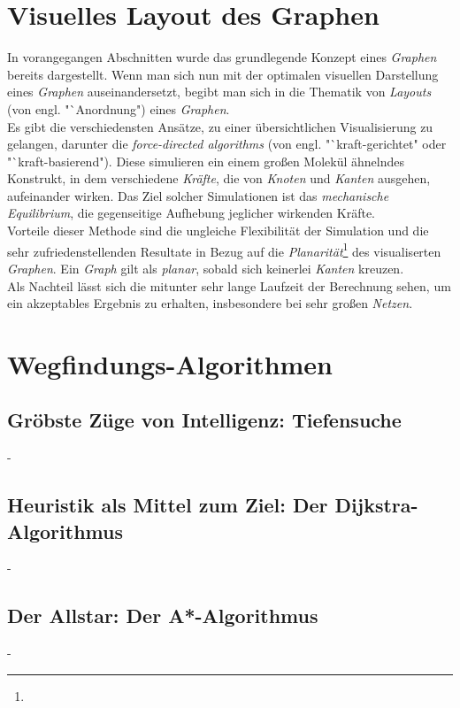 \documentclass[12pt]{article}
\begin{document}
\section{Visuelles Layout des Graphen}
\label{sec:layout}
In vorangegangen Abschnitten wurde das grundlegende Konzept eines \textit{Graphen} bereits dargestellt. Wenn man sich nun mit der optimalen visuellen Darstellung eines \textit{Graphen} auseinandersetzt,
begibt man sich in die Thematik von \textit{Layouts} (von engl. "`Anordnung") eines \textit{Graphen}.\\
Es gibt die verschiedensten Ansätze, zu einer übersichtlichen Visualisierung zu gelangen, darunter die \textit{force-directed algorithms} (von engl. "`kraft-gerichtet" oder "`kraft-basierend"). Diese simulieren
ein einem großen Molekül ähnelndes Konstrukt, in dem verschiedene \textit{Kräfte}, die von \textit{Knoten} und \textit{Kanten} ausgehen, aufeinander wirken. Das Ziel solcher Simulationen ist das 
\textit{mechanische Equilibrium}, die gegenseitige Aufhebung jeglicher wirkenden Kräfte.\\
Vorteile dieser Methode sind die ungleiche Flexibilität der Simulation und die sehr zufriedenstellenden Resultate in Bezug auf die \textit{Planarität}\footnote{} des visualiserten \textit{Graphen}.
Ein \textit{Graph} gilt als \textit{planar}, sobald sich keinerlei \textit{Kanten} kreuzen.\\
Als Nachteil lässt sich die mitunter sehr lange Laufzeit der Berechnung sehen, um ein akzeptables Ergebnis zu erhalten, insbesondere bei sehr großen \textit{Netzen}.
\newpage

\section{Wegfindungs-Algorithmen}
\newpage

\subsection{Gröbste Züge von Intelligenz: Tiefensuche}
\newpage
-
\newpage

\subsection{Heuristik als Mittel zum Ziel: Der Dijkstra-Algorithmus}
\newpage
-
\newpage

\subsection{Der Allstar: Der A*-Algorithmus}
\newpage
-
\newpage
\end{document}
